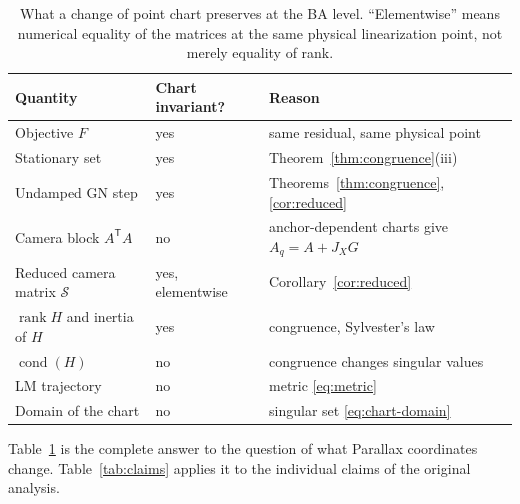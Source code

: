 \documentclass[11pt,a4paper]{article}
\theoremstyle{definition}
\theoremstyle{remark}
\DeclareMathOperator{\rank}{rank}
\DeclareMathOperator{\cond}{cond}
\newcommand{\T}{\mathsf{T}}
\begin{document}
\begin{table}[t]
\centering
\caption{What a change of point chart preserves at the BA level. ``Elementwise'' means numerical equality of the matrices at the same physical linearization point, not merely equality of rank.}
\label{tab:invariance}
\small
\begin{tabular}{lll}
\toprule
Quantity & Chart invariant? & Reason \\
\midrule
Objective $F$ & yes & same residual, same physical point \\
Stationary set & yes & Theorem~\ref{thm:congruence}(iii) \\
Undamped GN step & yes & Theorems~\ref{thm:congruence}, \ref{cor:reduced} \\
Camera block $A^{\T}A$ & no & anchor-dependent charts give $A_q=A+J_XG$ \\
Reduced camera matrix $\mathcal S$ & yes, elementwise & Corollary~\ref{cor:reduced} \\
$\rank H$ and inertia of $H$ & yes & congruence, Sylvester's law \\
$\cond(H)$ & no & congruence changes singular values \\
LM trajectory & no & metric \eqref{eq:metric} \\
Domain of the chart & no & singular set \eqref{eq:chart-domain} \\
\bottomrule
\end{tabular}
\end{table}

Table~\ref{tab:invariance} is the complete answer to the question of what Parallax coordinates change. Table~\ref{tab:claims} applies it to the individual claims of the original analysis.
\end{document}
